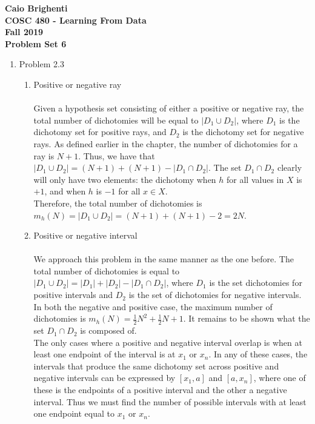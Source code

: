 \documentclass{article}
\begin{document}
\noindent \textbf{Caio Brighenti }\\
\noindent \textbf{COSC 480 - Learning From Data}\\%
\noindent \textbf{Fall 2019}\\%
\noindent \textbf{Problem Set 6}\vspace{1em}\\
\begin{enumerate}
	\item Problem 2.3
	\begin{enumerate}
		\item Positive or negative ray
		\\\\ Given a hypothesis set consisting of either a positive or negative ray, the total number of dichotomies will be equal to $|D_1 \cup D_2|$, where $D_1$ is the dichotomy set for positive rays, and $D_2$ is the dichotomy set for negative rays. As defined earlier in the chapter, the number of dichotomies for a ray is $N+1$. Thus, we have that $|D_1 \cup D_2| = (N+1)+(N+1)-|D_1 \cap D_2|$. The set $D_1 \cap D_2$ clearly will only have two elements: the dichotomy when $h$ for all values in $X$ is $+1$, and when $h$ is $-1$ for all $x \in X$.
		\\ Therefore, the total number of dichotomies is $m_h(N) = |D_1 \cup D_2| = (N+1)+(N+1)-2=2N$.
		\item Positive or negative interval
		\\\\ We approach this problem in the same manner as the one before. The total number of dichotomies is equal to $|D_1 \cup D_2| = |D_1| + |D_2| - |D_1 \cap D_2|$, where $D_1$ is the set dichotomies for positive intervals and $D_2$ is the set of dichotomies for negative intervals. In both the negative and positive case, the maximum number of dichotomies is $m_h(N)=\frac{1}{2}N^2+\frac{1}{2}N+1$. It remains to be shown what the set $D_1 \cap D_2$ is composed of.
		\\ The only cases where a positive and negative interval overlap is when at least one endpoint of the interval is at $x_1$ or $x_n$. In any of these cases, the intervals that produce the same dichotomy set across positive and negative intervals can be expressed by $[x_1,a]$ and $[a,x_n]$, where one of these is the endpoints of a positive interval and the other a negative interval. Thus we must find the number of possible intervals with at least one endpoint equal to $x_1$ or $x_n$.

\end{enumerate}
\end{enumerate}
\end{document}
